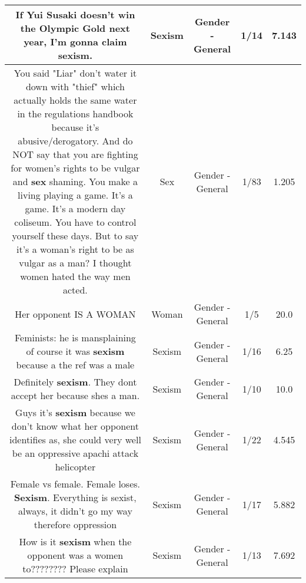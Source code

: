 \documentclass[11pt]{article}
\newlength\mylength
\begin{document}
\begin{center}
\begin{longtable}{|C{.65\mylength}|C{.30\mylength}|C{.12\mylength}|C{.12\mylength}|C{.12\mylength}|}
  \small If Yui Susaki doesn't win the Olympic Gold next year, I'm gonna claim \textbf{sexism}.\normalsize   & Sexism & Gender - General & 1/14 & 7.143 \\  \hline
  \small You said "Liar" don't water it down with "thief" which actually holds the same water in the regulations handbook because it's abusive/derogatory.  And do NOT say that you are fighting for women's rights to be vulgar and \textbf{sex} shaming.  You make a living playing a game.  It's a game.  It's a modern day coliseum.  You have to control yourself these days. But to say it's a woman's right to be as vulgar as a man?  I thought women hated the way men acted.\normalsize   & Sex & Gender - General & 1/83 & 1.205 \\  \hline
  \small Her opponent IS A WOMAN\normalsize   & Woman & Gender - General & 1/5 & 20.0 \\  \hline
  \small Feminists: he is mansplaining of course it was \textbf{sexism} because a the ref was a male\normalsize   & Sexism & Gender - General & 1/16 & 6.25 \\  \hline
  \small Definitely \textbf{sexism}. They dont accept her because shes a man.\normalsize   & Sexism & Gender - General & 1/10 & 10.0 \\  \hline
  \small Guys it's \textbf{sexism} because we don't know what her opponent identifies as, she could very well be an oppressive apachi attack helicopter\normalsize   & Sexism & Gender - General & 1/22 & 4.545 \\  \hline
  \small Female vs female. Female loses. \textbf{Sexism}. Everything is sexist, always, it didn't go my way therefore oppression\normalsize   & Sexism & Gender - General & 1/17 & 5.882 \\  \hline
  \small How is it \textbf{sexism} when the opponent was a women to????????   Please explain\normalsize   & Sexism & Gender - General & 1/13 & 7.692 \\  \hline

\end{longtable}
\end{center}
\end{document}
